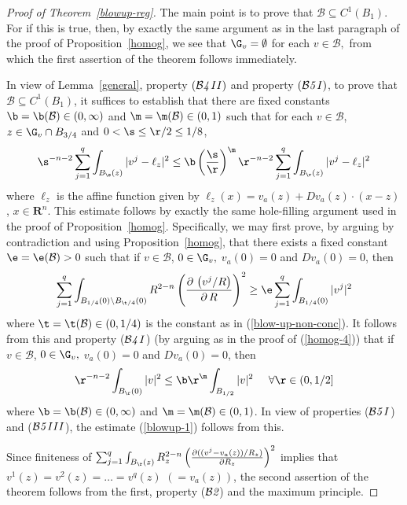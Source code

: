 \documentclass[a4paper,11pt]{amsart}
\begin{document}
\begin{proof}[Proof of Theorem~\ref{blowup-reg}] The main point is to prove that ${\mathcal B} \subseteq  C^{1}(B_{1}).$ For if this is true, 
then, by exactly the same argument as in the last paragraph of the proof of Proposition~\ref{homog}, we see that 
$\G_{v}  = \emptyset$ for each $v \in {\mathcal B},$ from which the first assertion of the theorem follows immediately. 

In view of Lemma~\ref{general}, property $({\mathcal B{\emph 4\, II}})$ and property $({\mathcal B{\emph 5\, I}})$, to prove that ${\mathcal B}  \subseteq C^{1}(B_{1})$, it suffices to establish that there are fixed constants $\b  = \b({\mathcal B}) \in (0, \infty)$ and 
$\m  = \m({\mathcal B}) \in (0, 1)$ such that for each $v \in {\mathcal B}$, $z \in \G_{v} \cap B_{3/4}$ and $0 < \s \leq \r/2 \leq1/8$,
\begin{equation}\label{blowup-1}
\s^{-n-2}\sum_{j=1}^{q}\int_{B_{\s}(z)} |v^{j} - \ell_{z}|^{2} \leq \b\left(\frac{\s}{\r}\right)^{\m} \r^{-n-2}
\sum_{j=1}^{q}\int_{B_{\r}(z)}|v^{j} - \ell_{z}|^{2}
\end{equation}
where $\ell_{z}$ is the affine function given by $\ell_{z}(x) = v_{a}(z) + Dv_{a}(z) \cdot (x- z)$, $x \in {\mathbf R}^{n}.$ This estimate follows by exactly the same hole-filling
argument used in the proof of Proposition~\ref{homog}. Specifically, we may first prove, by arguing by contradiction and using Proposition~\ref{homog},  that 
there exists a fixed constant $\e = \e({\mathcal B}) >0$ such that if $v \in {\mathcal B}$, $0 \in \G_{v},$ $v_{a}(0) = 0$ and 
$Dv_{a}(0) = 0$, then 
$$\sum_{j=1}^{q}\int_{B_{1/4}(0) \setminus B_{\t/4}(0)} R^{2-n} \left(\frac{\partial\, \left(v^{j}/R\right)}{\partial\, R}\right)^{2} 
\geq \e \sum_{j=1}^{q}\int_{B_{1/4}(0)}|v^{j}|^{2}$$
where $\t = \t({\mathcal B}) \in (0, 1/4)$ is the constant as in (\ref{blow-up-non-conc}). It follows from this and property (${\mathcal B{\emph 4 \, I}}$) (by arguing as in the proof of (\ref{homog-4})) that if $v \in {\mathcal B}$, $0 \in \G_{v},$ $v_{a}(0) = 0$ and $Dv_{a}(0) = 0$, then
$$\r^{-n-2}\int_{B_{\r}(0)}|v|^{2} \leq \b\r^{\m}\int_{B_{1/2}}|v|^{2} \;\;\;\;\; \forall \r \in (0, 1/2]$$
where $\b = \b({\mathcal B}) \in (0, \infty)$ and $\m  = \m({\mathcal B}) \in (0, 1)$. In view of properties (${\mathcal B{\emph 5 \, I}}$) and (${\mathcal B{\emph 5 \, III}}$), the estimate (\ref{blowup-1}) follows from this.

Since finiteness of $\sum_{j=1}^{q}\int_{B_{\r}(z)}R_{z}^{2-n}\left(\frac{\partial((v^{j} - v_{a}(z))/R_{z})}{\partial R_{z}}\right)^{2}$ implies that $v^{1}(z) = v^{2}(z) =\ldots =v^{q}(z)$ $(= v_{a}(z))$, the second assertion of the theorem follows from the first, property (${\mathcal B{\emph 2}}$) and 
the maximum principle. 
\end{proof}
\end{document}
